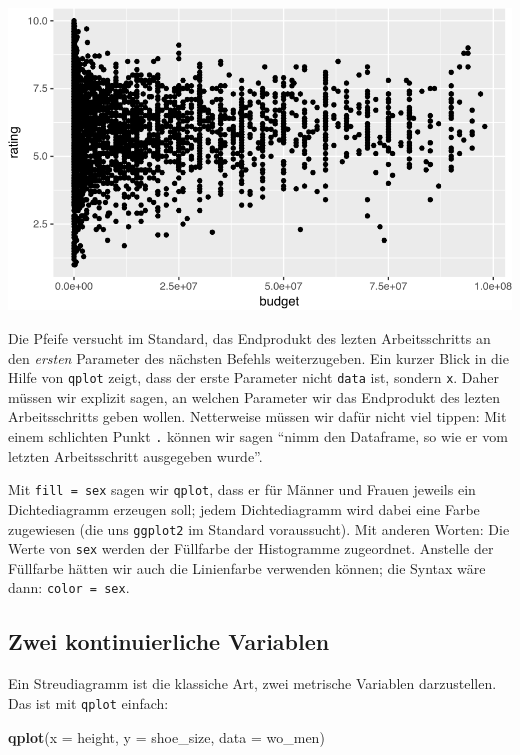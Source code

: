\documentclass[12pt,]{book}
\newenvironment{Shaded}{\begin{snugshade}}{\end{snugshade}}
\newcommand{\KeywordTok}[1]{\textcolor[rgb]{0.13,0.29,0.53}{\textbf{{#1}}}}
\newcommand{\DataTypeTok}[1]{\textcolor[rgb]{0.13,0.29,0.53}{{#1}}}
\newcommand{\NormalTok}[1]{{#1}}
\begin{document}
\begin{center}\includegraphics[width=0.7\linewidth]{050_Daten_visualisieren_files/figure-latex/unnamed-chunk-14-1} \end{center}

Die Pfeife versucht im Standard, das Endprodukt des lezten
Arbeitsschritts an den \emph{ersten} Parameter des nächsten Befehls
weiterzugeben. Ein kurzer Blick in die Hilfe von \texttt{qplot} zeigt,
dass der erste Parameter nicht \texttt{data} ist, sondern \texttt{x}.
Daher müssen wir explizit sagen, an welchen Parameter wir das Endprodukt
des lezten Arbeitsschritts geben wollen. Netterweise müssen wir dafür
nicht viel tippen: Mit einem schlichten Punkt \texttt{.} können wir
sagen ``nimm den Dataframe, so wie er vom letzten Arbeitsschritt
ausgegeben wurde''.

Mit \texttt{fill\ =\ sex} sagen wir \texttt{qplot}, dass er für Männer
und Frauen jeweils ein Dichtediagramm erzeugen soll; jedem
Dichtediagramm wird dabei eine Farbe zugewiesen (die uns
\texttt{ggplot2} im Standard voraussucht). Mit anderen Worten: Die Werte
von \texttt{sex} werden der Füllfarbe der Histogramme zugeordnet.
Anstelle der Füllfarbe hätten wir auch die Linienfarbe verwenden können;
die Syntax wäre dann: \texttt{color\ =\ sex}.

\subsection{Zwei kontinuierliche
Variablen}\label{zwei-kontinuierliche-variablen}

Ein Streudiagramm ist die klassiche Art, zwei metrische Variablen
darzustellen. Das ist mit \texttt{qplot} einfach:

\begin{Shaded}
\begin{Highlighting}[]
\KeywordTok{qplot}\NormalTok{(}\DataTypeTok{x =} \NormalTok{height, }\DataTypeTok{y =} \NormalTok{shoe_size, }\DataTypeTok{data =} \NormalTok{wo_men)}
\end{Highlighting}
\end{Shaded}
\end{document}
